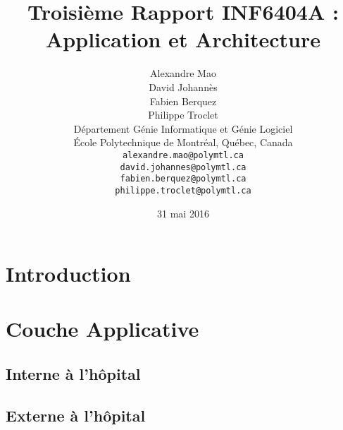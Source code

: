 \documentclass{article}
\title{Troisième Rapport INF6404A : Application et Architecture}
\author{
	Alexandre Mao\\
	David Johannès \\
	Fabien Berquez \\
	Philippe Troclet \\
	D\'{e}partement G\'{e}nie Informatique et G\'{e}nie Logiciel \\
	\'{E}cole Polytechnique de Montr\'{e}al, Qu\'{e}bec, Canada \\
	\texttt{alexandre.mao@polymtl.ca}\\
	\texttt{david.johannes@polymtl.ca}\\
	\texttt{fabien.berquez@polymtl.ca}   \\
	\texttt{philippe.troclet@polymtl.ca}   \\
}
\date{31 mai 2016}
\begin{document}
\maketitle

\section{Introduction}


 
\section{Couche Applicative}
\subsection{Interne à l'hôpital}

\subsection{Externe à l'hôpital}







\end{document}
